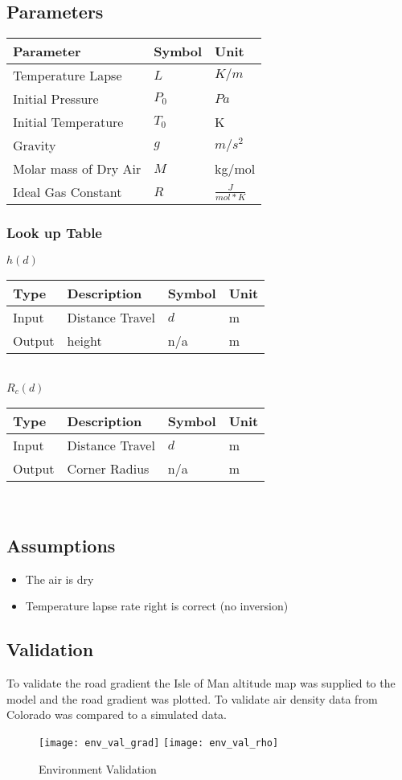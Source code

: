 \documentclass[../SimBALink.tex]{subfiles}
\begin{document}
\subsection{Parameters}
	\begin{tabular}{ l | l | l  }
		Parameter					&	Symbol		&	Unit		\\	\hline
		Temperature Lapse		&	$L$			&	 $K/m$ \\
		Initial Pressure 		&  $P_0$		&	$Pa$ \\
		Initial Temperature		&  $T_0$		&	K \\
		Gravity 				&  $g$			&  $m/s^2$ \\
		Molar mass of Dry Air	& $M$			&  kg/mol \\
		Ideal Gas Constant 		& $R$			& $\frac{J}{mol * K}$
	\end{tabular}
	
	\subsubsection{Look up Table}
	$h(d)$ \\
	\begin{tabular}{ l | l | l | l }
		Type				& Description		&	Symbol		&	Unit		\\	\hline
		Input 				& Distance Travel	&	$d$  		& m		\\
		Output 				& height 			&	n/a			&  m
	\end{tabular} \\
		$R_c(d)$ \\
	\begin{tabular}{ l | l | l | l }
		Type				& Description		&	Symbol		&	Unit		\\	\hline
		Input 				& Distance Travel	&	$d$  		& m		\\
		Output 				& Corner Radius 	&	n/a			&  m
	\end{tabular} \\
\subsection{Assumptions}
\begin{itemize}
  \item The air is dry 
  \item Temperature lapse rate right is correct (no inversion)
\end{itemize}

\subsection{Validation}

To validate the road gradient the Isle of Man altitude map was supplied to the model and the road gradient was plotted. To validate air density data from Colorado was compared to a simulated data.

\begin{figure}[H]
\center
 \texttt{[image: env\_val\_grad]}
 \texttt{[image: env\_val\_rho]}
  \caption{Environment Validation}
\end{figure}
\end{document}
